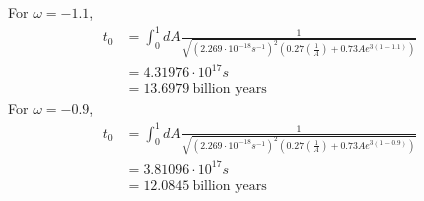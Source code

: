 \begin{enumerate}[label=(\alph*)]
For $\omega=-1.1$,
\begin{align*}
t_0 	&= \int^{1}_0 dA \frac{1}{\sqrt{(2.269 \cdot 10^{-18}s^{-1})^2  \left( 0.27 \left( \frac{1}{A}\right) + 0.73 A e^{3(1-1.1)}	\right)}}\\
	&=4.31976\cdot10^{17} s\\
	&=13.6979 \> \text{billion years}
\end{align*}
For $\omega=-0.9$,
\begin{align*}
t_0 	&= \int^{1}_0 dA \frac{1}{\sqrt{(2.269 \cdot 10^{-18}s^{-1})^2  \left( 0.27 \left( \frac{1}{A}\right) + 0.73 A e^{3(1-0.9)}	\right)}}\\
	&=3.81096\cdot10^{17} s\\
	&=12.0845 \> \text{billion years}
\end{align*}
\end{enumerate}
